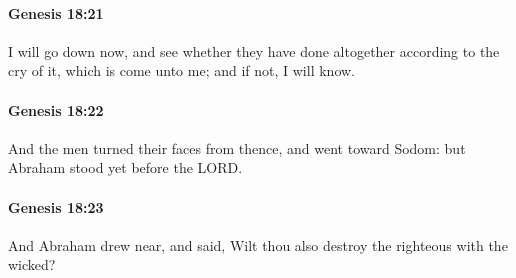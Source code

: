 		\paragraph{Genesis 18:21} %
			\label{GENESIS-18-21}

			I will go down now, and see whether they have done altogether according to the cry of it, which is come unto me; and if not, I will know.


		\paragraph{Genesis 18:22} %
			\label{GENESIS-18-22}

			And the men turned their faces from thence, and went toward Sodom: but Abraham stood yet before the LORD.


		\paragraph{Genesis 18:23} %
			\label{GENESIS-18-23}

			And Abraham drew near, and said, Wilt thou also destroy the righteous with the wicked?


